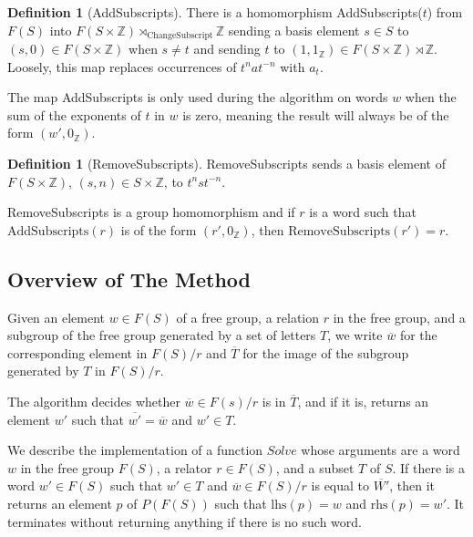 \documentclass[12pt]{article} %
\theoremstyle{definition}
\theoremstyle{definition}
\theoremstyle{definition}
\theoremstyle{definition}
\theoremstyle{definition}
\newtheorem{defn}[theorem]{Definition}
\theoremstyle{definition}
\begin{document}
\begin{defn}[AddSubscripts]\label{AddSubscripts}
  There is a homomorphism AddSubscripts($t$) from $F(S)$ into $F(S \times \mathbb{Z})
  \rtimes_{\text{ChangeSubscript}} \mathbb{Z}$ sending a basis element $s \in S$ to
  $(s, 0) \in F(S \times \mathbb{Z})$ when $s \ne t$ and sending $t$ to
  $(1, 1_\mathbb{Z}) \in F(S \times \mathbb{Z}) \rtimes \mathbb{Z}$. Loosely, this map
  replaces occurrences of $t^n a t^{-n}$ with $a_t$.
\end{defn}

The map AddSubscripts is only used during the algorithm on words $w$ when the sum of the
exponents of $t$ in $w$ is zero, meaning the result will always be of the form
$(w', 0_{\mathbb{Z}})$.

\begin{defn}[RemoveSubscripts]
  RemoveSubscripts sends a basis element of \newline $F(S\times \mathbb{Z})$,  $(s, n) \in S\times \mathbb{Z}$,
  to $t^n s t^{-n}$.
\end{defn}
RemoveSubscripts is a group homomorphism and if $r$ is a word such that \newline
$\text{AddSubscripts}(r)$ is of the form $(r', 0_\mathbb{Z})$,
then $\text{RemoveSubscripts}(r')=r$.

\subsection{Overview of The Method}

Given an element $w \in F(S)$ of a free group,
a relation $r$ in the free group, and a subgroup of the free group
generated by a set of letters $T$,
we write $\overline {w}$ for the corresponding element in $F(S) / r$
and $\overline{T}$ for the image of the subgroup generated by $T$ in $F(S)/r$.

The algorithm decides whether $\overline{w} \in F(s) / r$ is in $\overline{T}$,
and if it is, returns an element $w'$ such that $\overline{w'} = \overline{w}$ and $w' \in T$.

We describe the implementation of a function $\textit{Solve}$ whose arguments are a word $w$
in the free group $F(S)$, a relator $r \in F(S)$,
and a subset $T$ of $S$. If there is a word $w' \in F(S)$
such that $w' \in T$ and $\overline{w} \in F(S) / r$ is
equal to $\overline{W'}$, then it returns an element $p$ of $P(F(S))$
such that $\text{lhs}(p) = w$ and $\text{rhs}(p) = w'$. It terminates
without returning anything if there is no such word.
\end{document}
